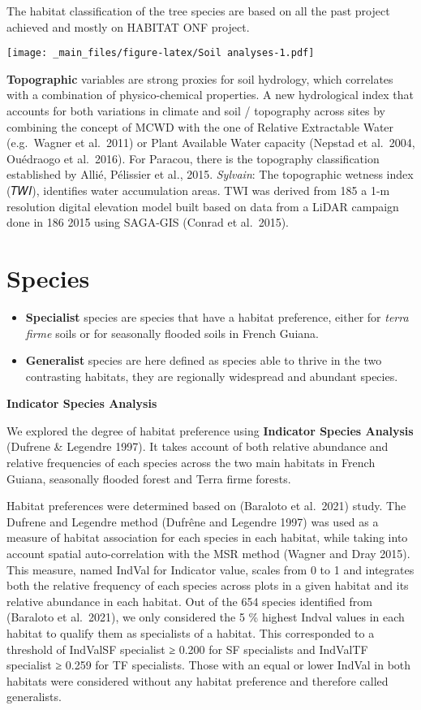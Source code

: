 \documentclass[
]{book}
\begin{document}
The habitat classification of the tree species are based on all the past project achieved and mostly on HABITAT ONF project.

\texttt{[image: \_main\_files/figure-latex/Soil analyses-1.pdf]}

\textbf{Topographic} variables are strong proxies for soil hydrology, which correlates with a combination of physico-chemical properties. A new hydrological index that accounts for both variations in climate and soil / topography across sites by combining the concept of MCWD with the one of Relative Extractable Water (e.g.~Wagner et al.~2011) or Plant Available Water capacity (Nepstad et al.~2004, Ouédraogo et al.~2016). For Paracou, there is the topography classification established by Allié, Pélissier et al., 2015. \emph{Sylvain}: The topographic wetness index (𝑇𝑊𝐼), identifies water accumulation areas. TWI was derived from 185 a 1-m resolution digital elevation model built based on data from a LiDAR campaign done in 186 2015 using SAGA-GIS (Conrad et al.~2015).

\hypertarget{species}{%
\section{Species}\label{species}}

\begin{itemize}
\item
  \textbf{Specialist} species are species that have a habitat preference, either for \emph{terra firme} soils or for seasonally flooded soils in French Guiana.
\item
  \textbf{Generalist} species are here defined as species able to thrive in the two contrasting habitats, they are regionally widespread and abundant species.
\end{itemize}

\textbf{Indicator Species Analysis}

We explored the degree of habitat preference using \textbf{Indicator Species Analysis} (Dufrene \& Legendre 1997). It takes account of both relative abundance and relative frequencies of each species across the two main habitats in French Guiana, seasonally flooded forest and Terra firme forests.

Habitat preferences were determined based on (Baraloto et al.~2021) study. The Dufrene and Legendre method (Dufrêne and Legendre 1997) was used as a measure of habitat association for each species in each habitat, while taking into account spatial auto-correlation with the MSR method (Wagner and Dray 2015). This measure, named IndVal for Indicator value, scales from 0 to 1 and integrates both the relative frequency of each species across plots in a given habitat and its relative abundance in each habitat. Out of the 654 species identified from (Baraloto et al.~2021), we only considered the 5 \% highest Indval values in each habitat to qualify them as specialists of a habitat. This corresponded to a threshold of IndValSF specialist ≥ 0.200 for SF specialists and IndValTF specialist ≥ 0.259 for TF specialists. Those with an equal or lower IndVal in both habitats were considered without any habitat preference and therefore called generalists.
\end{document}
